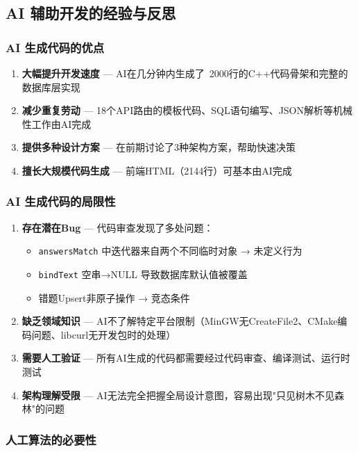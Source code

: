 \documentclass[12pt,a4paper]{ctexart}
\begin{document}
\subsection{AI 辅助开发的经验与反思}

\subsubsection{AI 生成代码的优点}

\begin{enumerate}[nosep]
    \item \textbf{大幅提升开发速度} — AI在几分钟内生成了~2000行的C++代码骨架和完整的数据库层实现
    \item \textbf{减少重复劳动} — 18个API路由的模板代码、SQL语句编写、JSON解析等机械性工作由AI完成
    \item \textbf{提供多种设计方案} — 在前期讨论了3种架构方案，帮助快速决策
    \item \textbf{擅长大规模代码生成} — 前端HTML（2144行）可基本由AI完成
\end{enumerate}

\subsubsection{AI 生成代码的局限性}

\begin{enumerate}[nosep]
    \item \textbf{存在潜在Bug} — 代码审查发现了多处问题：
    \begin{itemize}[nosep]
        \item \texttt{answersMatch} 中迭代器来自两个不同临时对象 → 未定义行为
        \item \texttt{bindText} 空串→NULL 导致数据库默认值被覆盖
        \item 错题Upsert非原子操作 → 竞态条件
    \end{itemize}
    \item \textbf{缺乏领域知识} — AI不了解特定平台限制（MinGW无CreateFile2、CMake编码问题、libcurl无开发包时的处理）
    \item \textbf{需要人工验证} — 所有AI生成的代码都需要经过代码审查、编译测试、运行时测试
    \item \textbf{架构理解受限} — AI无法完全把握全局设计意图，容易出现"只见树木不见森林"的问题
\end{enumerate}

\subsubsection{人工算法的必要性}
\end{document}
